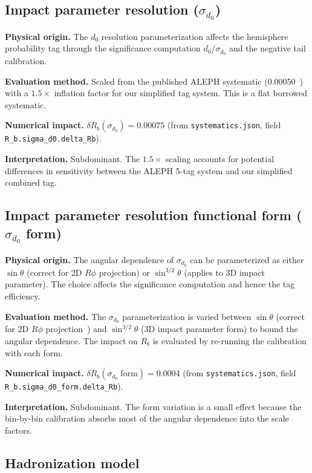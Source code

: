 \documentclass[11pt,a4paper]{article}
\begin{document}
\subsection{Impact parameter resolution ($\sigma_{d_0}$)}
\label{sec:syst_sigma_d0}

\textbf{Physical origin.} The $d_0$ resolution parameterization affects the hemisphere
probability tag through the significance computation $d_0/\sigma_{d_0}$ and the negative
tail calibration.

\textbf{Evaluation method.} Scaled from the published ALEPH systematic
(0.00050~\cite{ALEPH:Rb:1996}) with a $1.5\times$ inflation factor for our simplified
tag system. This is a flat borrowed systematic.

\textbf{Numerical impact.}
$\delta R_b(\sigma_{d_0}) = 0.00075$
(from \texttt{systematics.json}, field \texttt{R\_b.sigma\_d0.delta\_Rb}).

\textbf{Interpretation.} Subdominant. The $1.5\times$ scaling accounts for potential
differences in sensitivity between the ALEPH 5-tag system and our simplified combined tag.

\subsection{Impact parameter resolution functional form ($\sigma_{d_0}$ form)}
\label{sec:syst_sigma_d0_form}

\textbf{Physical origin.} The angular dependence of $\sigma_{d_0}$ can be parameterized
as either $\sin\theta$ (correct for 2D $R\phi$ projection) or $\sin^{3/2}\theta$
(applies to 3D impact parameter). The choice affects the significance computation
and hence the tag efficiency.

\textbf{Evaluation method.} The $\sigma_{d_0}$ parameterization is varied between
$\sin\theta$ (correct for 2D $R\phi$ projection~\cite{ALEPH:VDET}) and
$\sin^{3/2}\theta$ (3D impact parameter form) to bound the angular dependence.
The impact on $R_b$ is evaluated by re-running the calibration with each form.

\textbf{Numerical impact.}
$\delta R_b(\sigma_{d_0}\;\mathrm{form}) = 0.0004$
(from \texttt{systematics.json}, field \texttt{R\_b.sigma\_d0\_form.delta\_Rb}).

\textbf{Interpretation.} Subdominant. The form variation is a small effect because
the bin-by-bin calibration absorbs most of the angular dependence into the scale factors.

\subsection{Hadronization model}
\label{sec:syst_hadronization}
\end{document}
